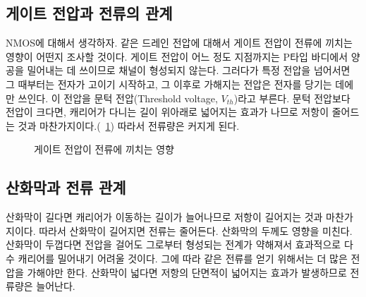 \subsection{게이트 전압과 전류의 관계}
NMOS에 대해서 생각하자. 같은 드레인 전압에 대해서 게이트 전압이 전류에 끼치는 영향이 어떤지 조사할 것이다.
게이트 전압이 어느 정도 지점까지는 P타입 바디에서 양공을 밀어내는 데 쓰이므로 채널이 형성되지 않는다. 그러다가 특정 전압을 넘어서면 그 때부터는 전자가 고이기 시작하고, 그 이후로 가해지는 전압은 전자를 당기는 데에만 쓰인다.
이 전압을 문턱 전압(Threshold voltage, $V_{th}$)라고 부른다. 문턱 전압보다 전압이 크다면, 캐리어가 다니는 길이 위아래로 넓어지는 효과가 나므로 저항이 줄어드는 것과 마찬가지이다.(\figurename~\ref{fig:vg effect on id}) 따라서 전류량은 커지게 된다.
\begin{figure}[!hpb]
    \centering
    \caption{게이트 전압이 전류에 끼치는 영향}\label{fig:vg effect on id}
\end{figure}
\subsection{산화막과 전류 관계}
산화막이 길다면 캐리어가 이동하는 길이가 늘어나므로 저항이 길어지는 것과 마찬가지이다. 따라서 산화막이 길어지면 전류는 줄어든다.
산화막의 두께도 영향을 미친다. 산화막이 두껍다면 전압을 걸어도 그로부터 형성되는 전계가 약해져서 효과적으로 다수 캐리어를 밀어내기 어려울 것이다. 그에 따라 같은 전류를 얻기 위해서는 더 많은 전압을 가해야만 한다.
산화막이 넓다면 저항의 단면적이 넓어지는 효과가 발생하므로 전류량은 늘어난다.
